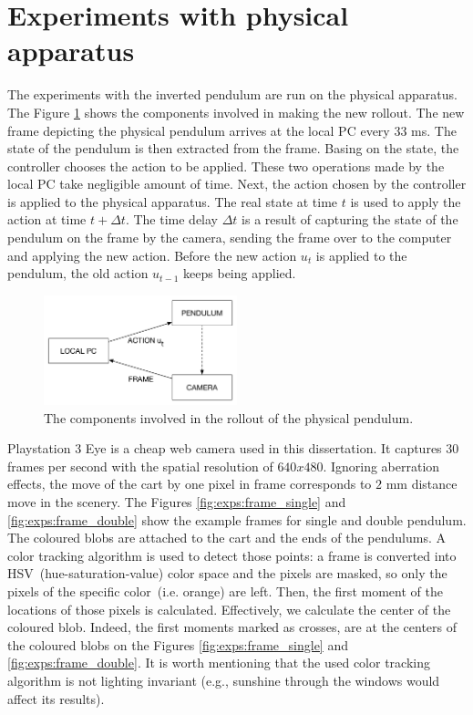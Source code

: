 \section{Experiments with physical apparatus}
\label{s:exps}
The experiments with the inverted pendulum are run on the physical apparatus. The Figure \ref{fig:exps:componentsrollout} shows the components involved in making the new rollout. The new frame depicting the physical pendulum arrives at the local PC every $33$ ms. The state of the pendulum is then extracted from the frame. Basing on the state, the controller chooses the action to be applied. These two operations made by the local PC take negligible amount of time. Next, the action chosen by the controller is applied to the physical apparatus. The real state at time $t$ is used to apply the action at time $t+\Delta t$. The time delay $\Delta t$ is a result of capturing the state of the pendulum on the frame by the camera, sending the frame over to the computer and applying the new action. Before the new action $u_{t}$ is applied to the pendulum, the old action $u_{t-1}$ keeps being applied.

\begin{figure}[H]
\centering
\includegraphics[width=0.5\textwidth, scale=0.5]{plots/rollout_components}
\caption{\label{fig:exps:componentsrollout} The components involved in the rollout of the physical pendulum. }
\end{figure}

\noindent Playstation 3 Eye is a cheap web camera used in this dissertation. It captures $30$ frames per second with the spatial resolution of $640x480$. Ignoring aberration effects, the move of the cart by one pixel in frame corresponds to $2$ mm distance move in the scenery. The Figures \ref{fig:exps:frame_single} and \ref{fig:exps:frame_double} show the example frames for single and double pendulum. The coloured blobs are attached to the cart and the ends of the pendulums. A color tracking algorithm is used to detect those points: a frame is converted into HSV\ (hue-saturation-value) color space and the pixels are masked, so only the pixels of the specific color\ (i.e. orange) are left. Then, the first moment of the locations of those pixels is calculated. Effectively, we calculate the center of the coloured blob. Indeed, the first moments marked as crosses, are at the centers of the coloured blobs on the Figures \ref{fig:exps:frame_single} and \ref{fig:exps:frame_double}. It is worth mentioning that the used color tracking algorithm is not lighting invariant (e.g., sunshine through the windows would affect its results).

